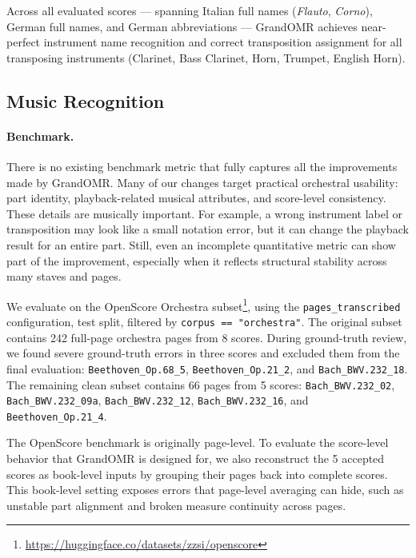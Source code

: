 \documentclass[11pt,a4paper]{article}
\begin{document}
Across all evaluated scores — spanning Italian full names (\textit{Flauto}, \textit{Corno}), German full names, and German abbreviations — GrandOMR achieves near-perfect instrument name recognition and correct transposition assignment for all transposing instruments (Clarinet, Bass Clarinet, Horn, Trumpet, English Horn).

\subsection{Music Recognition}

\paragraph{Benchmark.}
There is no existing benchmark metric that fully captures all the improvements made by GrandOMR.
Many of our changes target practical orchestral usability: part identity, playback-related musical attributes, and score-level consistency.
These details are musically important.
For example, a wrong instrument label or transposition may look like a small notation error, but it can change the playback result for an entire part.
Still, even an incomplete quantitative metric can show part of the improvement, especially when it reflects structural stability across many staves and pages.

We evaluate on the OpenScore Orchestra subset\footnote{\url{https://huggingface.co/datasets/zzsi/openscore}}, using the \texttt{pages\_transcribed} configuration, test split, filtered by \texttt{corpus == "orchestra"}.
The original subset contains 242 full-page orchestra pages from 8 scores.
During ground-truth review, we found severe ground-truth errors in three scores and excluded them from the final evaluation: \texttt{Beethoven\_Op.68\_5}, \texttt{Beethoven\_Op.21\_2}, and \texttt{Bach\_BWV.232\_18}.
The remaining clean subset contains 66 pages from 5 scores: \texttt{Bach\_BWV.232\_02}, \texttt{Bach\_BWV.232\_09a}, \texttt{Bach\_BWV.232\_12}, \texttt{Bach\_BWV.232\_16}, and \texttt{Beethoven\_Op.21\_4}.

The OpenScore benchmark is originally page-level.
To evaluate the score-level behavior that GrandOMR is designed for, we also reconstruct the 5 accepted scores as book-level inputs by grouping their pages back into complete scores.
This book-level setting exposes errors that page-level averaging can hide, such as unstable part alignment and broken measure continuity across pages.
\end{document}
